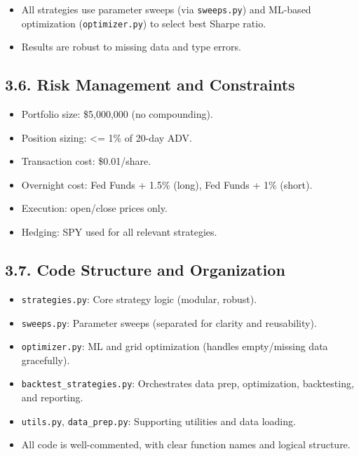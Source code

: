 \documentclass[11pt]{article}
\providecommand{\tightlist}{%
      \setlength{\itemsep}{0pt}\setlength{\parskip}{0pt}}
\begin{document}
\begin{itemize}
\tightlist
\item
  All strategies use parameter sweeps (via \texttt{sweeps.py}) and
  ML-based optimization (\texttt{optimizer.py}) to select best Sharpe
  ratio.
\item
  Results are robust to missing data and type errors.
\end{itemize}

\subsection*{3.6. Risk Management and
Constraints}\label{risk-management-and-constraints}

\begin{itemize}
\tightlist
\item
  Portfolio size: \$5,000,000 (no compounding).
\item
  Position sizing: \textless= 1\% of 20-day ADV.
\item
  Transaction cost: \$0.01/share.
\item
  Overnight cost: Fed Funds + 1.5\% (long), Fed Funds + 1\% (short).
\item
  Execution: open/close prices only.
\item
  Hedging: SPY used for all relevant strategies.
\end{itemize}

\subsection*{3.7. Code Structure and
Organization}\label{code-structure-and-organization}

\begin{itemize}
\tightlist
\item
  \texttt{strategies.py}: Core strategy logic (modular, robust).
\item
  \texttt{sweeps.py}: Parameter sweeps (separated for clarity and
  reusability).
\item
  \texttt{optimizer.py}: ML and grid optimization (handles empty/missing
  data gracefully).
\item
  \texttt{backtest\_strategies.py}: Orchestrates data prep,
  optimization, backtesting, and reporting.
\item
  \texttt{utils.py}, \texttt{data\_prep.py}: Supporting utilities and
  data loading.
\item
  All code is well-commented, with clear function names and logical
  structure.
\end{itemize}
\end{document}
